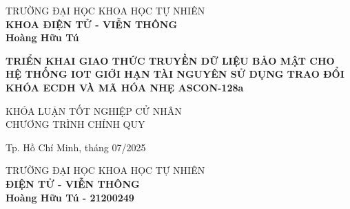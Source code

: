 \begin{titlepage}
\thispagestyle{empty}
\begin{center}
TRƯỜNG ĐẠI HỌC KHOA HỌC TỰ NHIÊN\\
\textbf{KHOA ĐIỆN TỬ - VIỄN THÔNG}\\[2cm]


{ \Large \bfseries Hoàng Hữu Tú\\[2cm] } 


{ \Large \bfseries TRIỂN KHAI GIAO THỨC TRUYỀN DỮ LIỆU BẢO MẬT CHO HỆ THỐNG IOT GIỚI HẠN TÀI NGUYÊN SỬ DỤNG TRAO ĐỔI KHÓA ECDH VÀ MÃ HÓA NHẸ ASCON-128a \\[3cm]} 


\large KHÓA LUẬN TỐT NGHIỆP CỬ NHÂN\\
\large CHƯƠNG TRÌNH CHÍNH QUY\\



\vfill
Tp. Hồ Chí Minh, tháng 07/2025

\end{center}

\pagebreak


\thispagestyle{empty}
\begin{center}

TRƯỜNG ĐẠI HỌC KHOA HỌC TỰ NHIÊN\\
\textbf{ĐIỆN TỬ - VIỄN THÔNG}\\[2cm]


{\large \bfseries Hoàng Hữu Tú - 21200249\\[2cm]} 



\end{center}
\end{titlepage}
